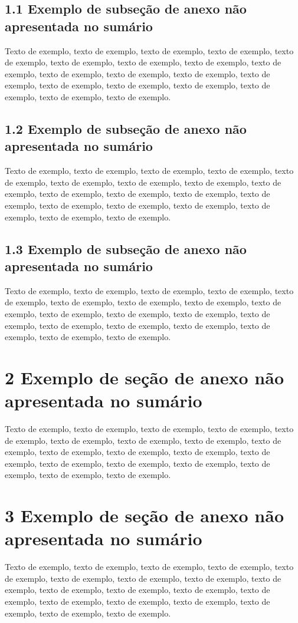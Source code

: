 \documentclass[
	12pt,				%
	oneside,			%
	a4paper,			%
	english,			%
	brazil				%
	]{abntex2ppgsi}
\begin{document}
\begin{anexosenv}
\subsection*{1.1 Exemplo de subseção de anexo não apresentada no sumário}

Texto de exemplo, texto de exemplo, texto de exemplo, texto de exemplo, texto de exemplo, texto de exemplo, texto de exemplo, texto de exemplo, texto de exemplo, texto de exemplo, texto de exemplo, texto de exemplo, texto de exemplo, texto de exemplo, texto de exemplo, texto de exemplo, texto de exemplo, texto de exemplo, texto de exemplo.

\subsection*{1.2 Exemplo de subseção de anexo não apresentada no sumário}

Texto de exemplo, texto de exemplo, texto de exemplo, texto de exemplo, texto de exemplo, texto de exemplo, texto de exemplo, texto de exemplo, texto de exemplo, texto de exemplo, texto de exemplo, texto de exemplo, texto de exemplo, texto de exemplo, texto de exemplo, texto de exemplo, texto de exemplo, texto de exemplo, texto de exemplo.

\subsection*{1.3 Exemplo de subseção de anexo não apresentada no sumário}

Texto de exemplo, texto de exemplo, texto de exemplo, texto de exemplo, texto de exemplo, texto de exemplo, texto de exemplo, texto de exemplo, texto de exemplo, texto de exemplo, texto de exemplo, texto de exemplo, texto de exemplo, texto de exemplo, texto de exemplo, texto de exemplo, texto de exemplo, texto de exemplo, texto de exemplo.

\section*{2 Exemplo de seção de anexo não apresentada no sumário}

Texto de exemplo, texto de exemplo, texto de exemplo, texto de exemplo, texto de exemplo, texto de exemplo, texto de exemplo, texto de exemplo, texto de exemplo, texto de exemplo, texto de exemplo, texto de exemplo, texto de exemplo, texto de exemplo, texto de exemplo, texto de exemplo, texto de exemplo, texto de exemplo, texto de exemplo.

\section*{3 Exemplo de seção de anexo não apresentada no sumário}

Texto de exemplo, texto de exemplo, texto de exemplo, texto de exemplo, texto de exemplo, texto de exemplo, texto de exemplo, texto de exemplo, texto de exemplo, texto de exemplo, texto de exemplo, texto de exemplo, texto de exemplo, texto de exemplo, texto de exemplo, texto de exemplo, texto de exemplo, texto de exemplo, texto de exemplo.

\end{anexosenv}

\end{document}
